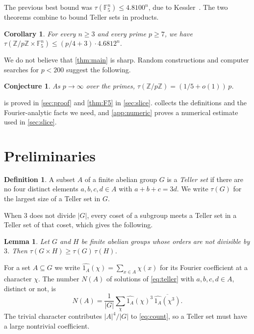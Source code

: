 \documentclass[11pt]{amsart}
\newtheorem{lem}[lem]{Lemma}
\newtheorem{cor}[thm]{Corollary}
\newtheorem{conj}[thm]{Conjecture}
\theoremstyle{definition}
\newtheorem{defn}[thm]{Definition}
\numberwithin{equation}{section}
\newcommand{\F}{\mathbb{F}}
\newcommand{\Z}{\mathbb{Z}}
\begin{document}
The previous best bound was $\tau(\F_5^n) \leq 4.8100^n$, due to Kessler~\cite{Kessler}. The two theorems combine to bound Teller sets in products.

\begin{cor}\label{cor:product}
For every $n \geq 3$ and every prime $p \geq 7$, we have $\tau(\Z/p\Z \times \F_5^n) \leq (p/4 + 3) \cdot 4.6812^n$.
\end{cor}

We do not believe that \cref{thm:main} is sharp. Random constructions and computer searches for $p < 200$ suggest the following.

\begin{conj}\label{conj:fifth}
As $p \to \infty$ over the primes, $\tau(\Z/p\Z) = (1/5 + o(1))\, p$.
\end{conj}

 is proved in \cref{sec:proof} and \cref{thm:F5} in \cref{sec:slice}.  collects the definitions and the Fourier-analytic facts we need, and \cref{app:numeric} proves a numerical estimate used in \cref{sec:slice}.

\section{Preliminaries}\label{sec:prelim}

\begin{defn}\label{def:teller}
A subset $A$ of a finite abelian group $G$ is a \emph{Teller set} if there are no four distinct elements $a, b, c, d \in A$ with $a + b + c = 3d$. We write $\tau(G)$ for the largest size of a Teller set in $G$.
\end{defn}

When $3$ does not divide $|G|$, every coset of a subgroup meets a Teller set in a Teller set of that coset, which gives the following.

\begin{lem}\label{lem:super}
Let $G$ and $H$ be finite abelian groups whose orders are not divisible by $3$. Then $\tau(G \times H) \geq \tau(G)\, \tau(H)$.
\end{lem}

For a set $A \subseteq G$ we write $\widehat{1_A}(\chi) = \sum_{x \in A} \chi(x)$ for its Fourier coefficient at a character $\chi$. The number $N(A)$ of solutions of \eqref{eq:teller} with $a, b, c, d \in A$, distinct or not, is
\begin{equation}\label{eq:count}
N(A) = \frac{1}{|G|} \sum_{\chi} \widehat{1_A}(\chi)^3\, \overline{\widehat{1_A}(\chi^3)}.
\end{equation}
The trivial character contributes $|A|^4/|G|$ to \eqref{eq:count}, so a Teller set must have a large nontrivial coefficient.
\end{document}
